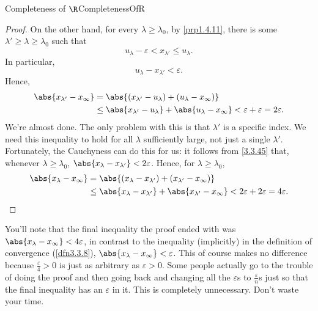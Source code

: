 \begin{thm}{Completeness of $\R$}{CompletenessOfR}
\begin{proof}
On the other hand, for every $\lambda \geq \lambda _0$, by \cref{prp1.4.11}, there is some $\lambda '\geq \lambda \geq \lambda _0$ such that
\begin{equation}
u_\lambda -\varepsilon <x_{\lambda '}\leq u_\lambda .
\end{equation}
In particular,
\begin{equation}
u_\lambda -x_{\lambda '}<\varepsilon .
\end{equation}
Hence,
\begin{equation}
\begin{split}
\abs{x_{\lambda '}-x_\infty} & =\abs{(x_{\lambda '}-u_\lambda )+(u_\lambda -x_\infty )} \\
& \leq \abs{x_{\lambda '}-u_\lambda}+\abs{u_\lambda -x_\infty}<\varepsilon +\varepsilon =2\varepsilon .
\end{split}
\end{equation}
We're almost done.  The only problem with this is that $\lambda '$ is a specific index.  We need this inequality to hold for all $\lambda$ sufficiently large, not just a single $\lambda '$.  Fortunately, the Cauchyness can do this for us:  it follows from \eqref{3.3.45} that, whenever $\lambda \geq \lambda _0$, $\abs{x_\lambda -x_{\lambda '}}<2\varepsilon$.  Hence, for $\lambda \geq \lambda _0$,
\begin{equation}
\begin{split}
\abs{x_\lambda -x_\infty} & =\abs{(x_\lambda -x_{\lambda '})+(x_{\lambda '}-x_\infty)} \\
& \leq \abs{x_\lambda -x_{\lambda '}}+\abs{x_{\lambda '}-x_\infty}<2\varepsilon +2\varepsilon =4\varepsilon .
\end{split}
\end{equation}
\end{proof}
\begin{rmk}
You'll note that the final inequality the proof ended with was $\abs{x_\lambda -x_\infty}<4\varepsilon$, in contrast to the inequality (implicitly) in the definition of convergence (\cref{dfn3.3.8}), $\abs{x_\lambda -x_\infty}<\varepsilon$.  This of course makes no difference because $\frac{\varepsilon}{4}>0$ is just as arbitrary as $\varepsilon>0$.  Some people actually go to the trouble of doing the proof and then going back and changing all the $\varepsilon$s to $\frac{\varepsilon}{n}$s just so that the final inequality has an $\varepsilon$ in it.  This is completely unnecessary.  Don't waste your time.
\end{rmk}
\end{thm}

